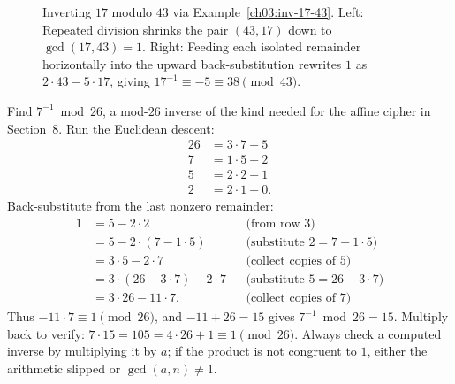 \begin{figure}[htbp]
\caption{Inverting $17$ modulo $43$ via Example~\ref{ch03:inv-17-43}. Left: Repeated division shrinks the pair $(43, 17)$ down to $\gcd(17, 43) = 1$. Right: Feeding each isolated remainder horizontally into the upward back-substitution rewrites $1$ as $2\cdot 43 - 5\cdot 17$, giving $17^{-1} \equiv -5 \equiv 38 \pmod{43}$.}
\label{fig:ch03-ext-euclid}
\end{figure}

\begin{example}
\label{ch03:inv-second}
Find $7^{-1} \bmod 26$, a mod-$26$ inverse of the kind needed for the affine cipher in Section~8. Run the Euclidean descent:
\begin{align*}
  26 &= 3\cdot 7 + 5 \\
   7 &= 1\cdot 5 + 2 \\
   5 &= 2\cdot 2 + 1 \\
   2 &= 2\cdot 1 + 0.
\end{align*}
Back-substitute from the last nonzero remainder:
\begin{align*}
  1 &= 5 - 2\cdot 2 && \text{(from row 3)} \\
    &= 5 - 2\cdot(7 - 1\cdot 5) && \text{(substitute $2 = 7 - 1\cdot 5$)} \\
    &= 3\cdot 5 - 2\cdot 7 && \text{(collect copies of $5$)} \\
    &= 3\cdot(26 - 3\cdot 7) - 2\cdot 7 && \text{(substitute $5 = 26 - 3\cdot 7$)} \\
    &= 3\cdot 26 - 11\cdot 7. && \text{(collect copies of $7$)}
\end{align*}
Thus $-11\cdot 7 \equiv 1 \pmod{26}$, and $-11 + 26 = 15$ gives $7^{-1} \bmod 26 = 15$. Multiply back to verify: $7\cdot 15 = 105 = 4\cdot 26 + 1 \equiv 1 \pmod{26}$. Always check a computed inverse by multiplying it by $a$; if the product is not congruent to $1$, either the arithmetic slipped or $\gcd(a,n) \ne 1$.
\end{example}

